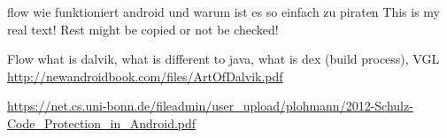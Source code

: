 flow wie funktioniert android und warum ist es so einfach zu piraten\newline
This is my real text! Rest might be copied or not be checked!


Flow what is dalvik, what is different to java, what is dex (build process), VGL \url{http://newandroidbook.com/files/ArtOfDalvik.pdf}\newline


\url{https://net.cs.uni-bonn.de/fileadmin/user_upload/plohmann/2012-Schulz-Code_Protection_in_Android.pdf}\newline
